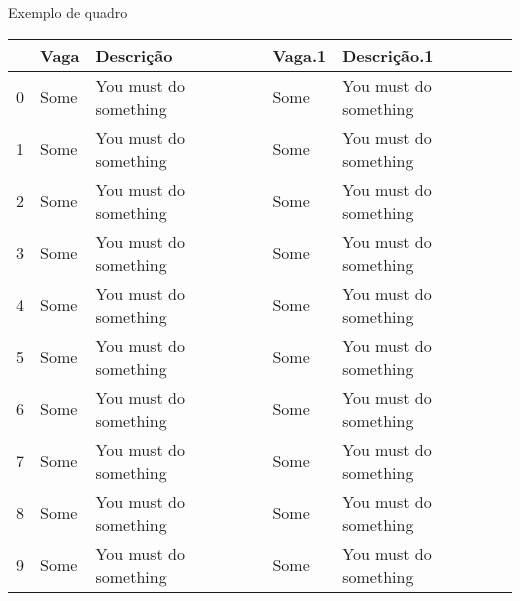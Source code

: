 \begin{quadro}[!h]
\caption{Exemplo de quadro}
\begin{tabular}{lllll}
\toprule
 & Vaga & Descrição & Vaga.1 & Descrição.1 \\
\midrule
0 & Some & You must do something & Some & You must do something \\
1 & Some & You must do something & Some & You must do something \\
2 & Some & You must do something & Some & You must do something \\
3 & Some & You must do something & Some & You must do something \\
4 & Some & You must do something & Some & You must do something \\
5 & Some & You must do something & Some & You must do something \\
6 & Some & You must do something & Some & You must do something \\
7 & Some & You must do something & Some & You must do something \\
8 & Some & You must do something & Some & You must do something \\
9 & Some & You must do something & Some & You must do something \\
\bottomrule
\end{tabular}

\fonte
\end{quadro}